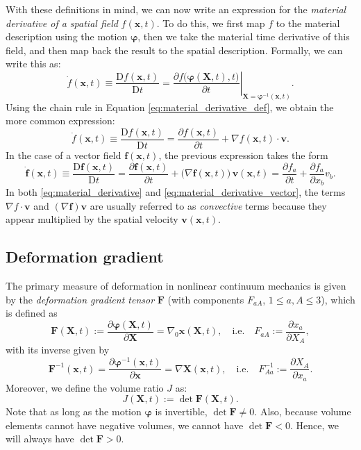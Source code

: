 \documentclass{sfuthesis}
\numberwithin{equation}{section}
\numberwithin{figure}{chapter}
\numberwithin{table}{chapter}
\theoremstyle{definition}
\def\*#1{{\mathbf{#1}}} %
\newcommand{\pder}[2]{\dfrac{\partial #1}{\partial #2}}
\newcommand{\Dder}[2]{\dfrac{\mathrm{D} #1}{\mathrm{D} #2}}
\def\bphi{{\bm{\varphi}}}
\begin{document}
With these definitions in mind, we can now write an expression for the \textit{material derivative of a spatial field} $f(\*x,t)$. To do this, we first map $f$ to the material description using the motion $\bphi$, then we take the material time derivative of this field, and then map back the result to the spatial description. Formally, we can write this as:
\begin{equation} \label{eq:material_derivative_def}
\dot{f}(\*x,t) \equiv \Dder{f(\*x,t)}{t} = \left. \pder{f\big( \bphi(\*X,t), t \big)}{t} \right|_{\*X = \bphi^{-1}(\*x,t)}.
\end{equation} 
Using the chain rule in Equation \eqref{eq:material_derivative_def}, we obtain the more common expression:
\begin{equation} \label{eq:material_derivative}
\dot{f}(\*x,t) \equiv \Dder{f(\*x,t)}{t} = \pder{f(\*x,t)}{t} + \nabla f(\*x,t) \cdot \*v.
\end{equation}
In the case of a vector field $\*f(\*x,t)$, the previous expression takes the form
\begin{equation} \label{eq:material_derivative_vector}
\dot{\*f}(\*x,t) \equiv \Dder{\*f(\*x,t)}{t} = \pder{\*f(\*x,t)}{t} + \big(\nabla \*f(\*x,t) \big) \, \*v(\*x,t) = \pder{f_a}{t}+\pder{f_a}{x_b}v_b.
\end{equation}
In both \eqref{eq:material_derivative} and \eqref{eq:material_derivative_vector}, the terms $\nabla f \cdot \*v$ and $(\nabla \*f) \*v$ are usually referred to as \textit{convective} terms because they appear multiplied by the spatial velocity $\*v(\*x,t)$.

\subsection{Deformation gradient}

The primary measure of deformation in nonlinear continuum mechanics is given by the \textit{deformation gradient tensor} $\*F$ (with components $F_{aA}$, $1\leq a,A \leq 3$), which is defined as
\begin{equation} \label{eq:def_F}
\*F(\*X,t) := \pder{\bphi(\*X,t)}{\*X} = \nabla_0 \*x(\*X,t), \quad \text{i.e.} \quad F_{aA} := \pder{x_a}{X_A},
\end{equation}
with its inverse given by
\begin{equation}
    \*F^{-1}(\*x,t) = \pder{\bphi^{-1}(\*x,t)}{\*x} = \nabla \*X(\*x,t), \quad \text{i.e.} \quad F^{-1}_{Aa} := \pder{X_A}{x_a}.
\end{equation}
Moreover, we define the volume ratio $J$ as:
\begin{equation}
J(\*X,t) := \det \*F(\*X,t).
\end{equation}
Note that as long as the motion $\bphi$ is invertible, $\det \*F \neq 0$. Also, because volume elements cannot have negative volumes, we cannot have $\det \*F < 0$. Hence, we will always have $\det \*F > 0$. 
\end{document}
